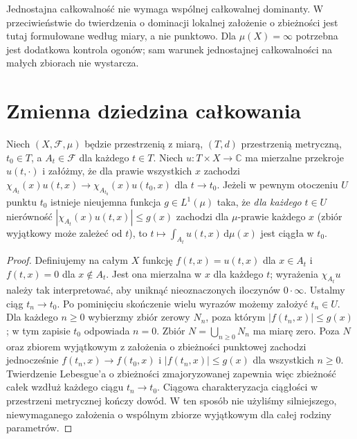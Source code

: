 \begin{uwaga}
Jednostajna całkowalność nie wymaga wspólnej
całkowalnej dominanty. W przeciwieństwie do twierdzenia
o dominacji lokalnej założenie o zbieżności jest tutaj
formułowane według miary, a nie punktowo. Dla $\mu(X)=\infty$
potrzebna jest dodatkowa kontrola ogonów; sam warunek
jednostajnej całkowalności na małych zbiorach nie wystarcza.
\end{uwaga}

\section{Zmienna dziedzina całkowania}

\begin{twierdzenie}
\label{thm:moving-domains-11}
Niech $(X,\mathcal F,\mu)$ będzie przestrzenią z miarą,
$(T,d)$ przestrzenią metryczną, $t_0\in T$,
a $A_t\in\mathcal F$ dla każdego $t\in T$.
Niech $u:T\times X\to\mathbb C$
ma mierzalne przekroje $u(t,\cdot)$ i załóżmy, że dla prawie
wszystkich $x$ zachodzi
$\chi_{A_t}(x)u(t,x)\to\chi_{A_{t_0}}(x)u(t_0,x)$
dla $t\to t_0$. Jeżeli w pewnym otoczeniu $U$ punktu $t_0$
istnieje nieujemna funkcja $g\in L^1(\mu)$ taka, że
\emph{dla każdego} $t\in U$ nierówność
$|\chi_{A_t}(x)u(t,x)|\le g(x)$
zachodzi dla $\mu$-prawie każdego $x$ (zbiór wyjątkowy
może zależeć od $t$), to
$t\mapsto\int_{A_t}u(t,x)\,\mathrm d\mu(x)$
jest ciągła w $t_0$.
\end{twierdzenie}
\begin{proof}
Definiujemy na całym $X$ funkcję
$f(t,x)=u(t,x)$ dla $x\in A_t$ i $f(t,x)=0$
dla $x\notin A_t$. Jest ona mierzalna w $x$ dla każdego $t$;
wyrażenia $\chi_{A_t}u$ należy tak interpretować,
aby uniknąć nieoznaczonych iloczynów $0\cdot\infty$.
Ustalmy ciąg $t_n\to t_0$. Po pominięciu skończenie
wielu wyrazów możemy założyć $t_n\in U$. Dla każdego
$n\ge0$ wybierzmy zbiór zerowy $N_n$, poza którym
$|f(t_n,x)|\le g(x)$; w tym zapisie $t_0$ odpowiada
$n=0$. Zbiór $N=\bigcup_{n\ge0}N_n$ ma miarę zero.
Poza $N$ oraz zbiorem wyjątkowym z założenia o zbieżności
punktowej zachodzi jednocześnie $f(t_n,x)\to f(t_0,x)$
i $|f(t_n,x)|\le g(x)$ dla wszystkich $n\ge0$.
Twierdzenie Lebesgue'a o zbieżności zmajoryzowanej
zapewnia więc zbieżność całek wzdłuż każdego ciągu
$t_n\to t_0$. Ciągowa charakteryzacja ciągłości
w przestrzeni metrycznej kończy dowód. W ten sposób
nie użyliśmy silniejszego, niewymaganego założenia
o wspólnym zbiorze wyjątkowym dla całej rodziny parametrów.
\end{proof}

